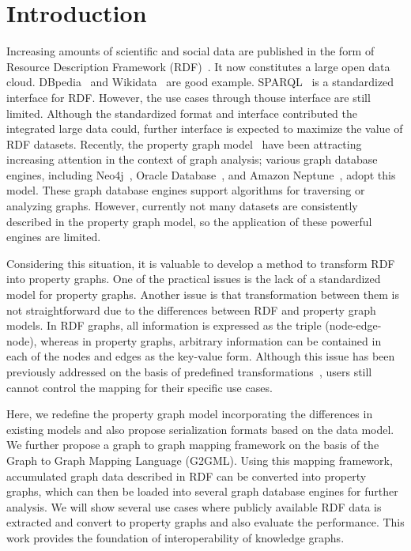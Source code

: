 \documentclass[runningheads]{llncs}
\begin{document}
\section{Introduction}

Increasing amounts of scientific and social data are published in the form of Resource Description Framework (RDF)~\cite{rdf}. It now constitutes a large open data cloud. DBpedia~\cite{dbpedia} and Wikidata~\cite{wikidata} are good example. SPARQL~\cite{sparql} is a standardized interface for RDF. However, the use cases through thouse interface are still limited. Although the standardized format and interface contributed the integrated large data could, further interface is expected to maximize the value of RDF datasets. 
Recently, the property graph model~\cite{angles1,angles2} have been attracting increasing attention in the context of graph analysis; various graph database engines, including Neo4j~\cite{neo4j}, Oracle Database~\cite{oracle}, and Amazon Neptune~\cite{neptune}, adopt this model. These graph database engines support algorithms for traversing or analyzing graphs. However, currently not many datasets are consistently described in the property graph model, so the application of these powerful engines are limited.

Considering this situation, it is valuable to develop a method to transform RDF into property graphs. One of the practical issues is the lack of a standardized model for property graphs. 
Another issue is that transformation between them is not straightforward due to the differences between RDF and property graph models. 
In RDF graphs, all information is expressed as the triple (node-edge-node), whereas in property graphs, arbitrary information can be contained in each of the nodes and edges as the key-value form. 
Although this issue has been previously addressed on the basis of predefined transformations~\cite{hartig},
users still cannot control the mapping for their specific use cases.

Here, we redefine the property graph model incorporating the differences in existing models and also propose serialization formats based on the data model. We further propose a graph to graph mapping framework on the basis of the Graph to Graph Mapping Language (G2GML). Using this mapping framework, accumulated graph data described in RDF can be converted into property graphs, which can then be loaded into several graph database engines for further analysis. We will show several use cases where publicly available RDF data is extracted and convert to property graphs and also evaluate the performance. This work provides the foundation of interoperability of knowledge graphs.
\end{document}
